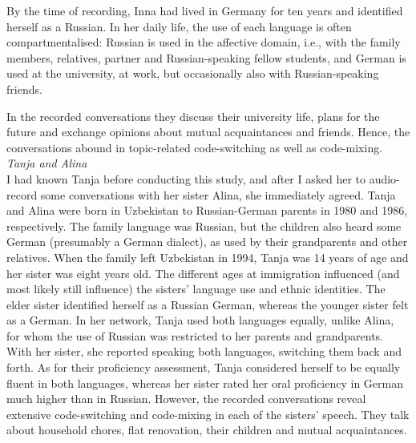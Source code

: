 By the time of recording, Inna had lived in Germany for ten years and identified herself as a Russian. In her daily life, the use of each language is often compartmentalised: Russian is used in the affective domain, i.e., with the family members, relatives, partner and Russian-speaking fellow students, and German is used at the university, at work, but occasionally also with Russian-speaking friends. 

In the recorded conversations they discuss their university life, plans for the future and exchange opinions about mutual acquaintances and friends. Hence, the conversations abound in topic-related code-switching as well as code-mixing.\\

\noindent \textit{Tanja and Alina}\\
I had known Tanja before conducting this study, and after I asked her to audio-record some conversations with her sister Alina, she immediately agreed. Tanja and Alina were born in Uzbekistan to Russian-German parents in 1980 and 1986, respectively. The family language was Russian, but the children also heard some German (presumably a German dialect), as used by their grandparents and other relatives. When the family left Uzbekistan in 1994, Tanja was 14 years of age and her sister was eight years old. The different ages at immigration influenced (and most likely still influence) the sisters' language use and ethnic identities. The elder sister identified herself as a Russian German, whereas the younger sister felt as a German. In her network, Tanja used both languages equally, unlike Alina, for whom the use of Russian was restricted to her parents and grandparents. With her sister, she reported speaking both languages, switching them back and forth. As for their proficiency assessment, Tanja considered herself to be equally fluent in both languages, whereas her sister rated her oral proficiency in German much higher than in Russian. However, the recorded conversations reveal extensive code-switching and code-mixing in each of the sisters' speech. They talk about household chores, flat renovation, their children and mutual acquaintances.\\

